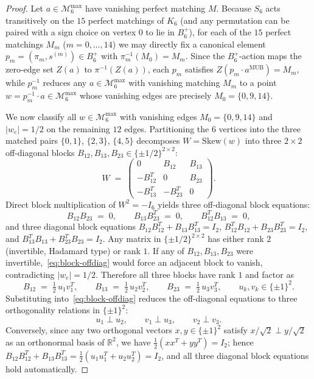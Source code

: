 \documentclass[11pt,a4paper]{article}
\theoremstyle{plain}
\theoremstyle{definition}
\theoremstyle{remark}
\newcommand{\R}{\mathbb{R}}
\newcommand{\Mman}{\mathcal{M}_6}
\newcommand{\Bplus}{B_6^+}
\begin{document}
\begin{proof}
Let $a \in \Mman^{\max}$ have vanishing perfect matching $M$. Because $S_6$ acts transitively on the $15$ perfect matchings of $K_6$ (and any permutation can be paired with a sign choice on vertex $0$ to lie in $\Bplus$), for each of the $15$ perfect matchings $M_m$ ($m = 0,\dots,14$) we may directly fix a canonical element $p_m = (\pi_m, s^{(m)}) \in \Bplus$ with $\pi_m^{-1}(M_0) = M_m$. Since the $\Bplus$-action maps the zero-edge set $Z(a)$ to $\pi^{-1}(Z(a))$, each $p_m$ satisfies $Z(p_m \cdot a^{\mathrm{MUB}}) = M_m$, while $p_m^{-1}$ reduces any $a \in \Mman^{\max}$ with vanishing matching $M_m$ to a point $w = p_m^{-1} \cdot a \in \Mman^{\max}$ whose vanishing edges are precisely $M_0 = \{0, 9, 14\}$.

We now classify all $w \in \Mman^{\max}$ with vanishing edges $M_0 = \{0, 9, 14\}$ and $\lvert w_e\rvert = 1/2$ on the remaining $12$ edges. Partitioning the $6$ vertices into the three matched pairs $\{0,1\}$, $\{2,3\}$, $\{4,5\}$ decomposes $W = \mathrm{Skew}(w)$ into three $2\times 2$ off-diagonal blocks $B_{12}, B_{13}, B_{23} \in \{\pm 1/2\}^{2\times 2}$:
\[
  W \;=\; \begin{pmatrix} 0 & B_{12} & B_{13} \\ -B_{12}^T & 0 & B_{23} \\ -B_{13}^T & -B_{23}^T & 0 \end{pmatrix}.
\]
Direct block multiplication of $W^2 = -I_6$ yields three off-diagonal block equations:
\begin{equation}
  \label{eq:block-offdiag}
  B_{12} B_{23} \;=\; 0, \qquad B_{13} B_{23}^T \;=\; 0, \qquad B_{12}^T B_{13} \;=\; 0,
\end{equation}
and three diagonal block equations $B_{12}B_{12}^T + B_{13}B_{13}^T = I_2$, $B_{12}^T B_{12} + B_{23} B_{23}^T = I_2$, and $B_{13}^T B_{13} + B_{23}^T B_{23} = I_2$. Any matrix in $\{\pm 1/2\}^{2\times 2}$ has either rank $2$ (invertible, Hadamard type) or rank $1$. If any of $B_{12}, B_{13}, B_{23}$ were invertible,~\eqref{eq:block-offdiag} would force an adjacent block to vanish, contradicting $\lvert w_e\rvert = 1/2$. Therefore all three blocks have rank $1$ and factor as
\[
  B_{12} \;=\; \tfrac{1}{2}\,u_1 v_1^T, \qquad
  B_{13} \;=\; \tfrac{1}{2}\,u_2 v_2^T, \qquad
  B_{23} \;=\; \tfrac{1}{2}\,u_3 v_3^T, \qquad u_k, v_k \in \{\pm 1\}^2.
\]
Substituting into~\eqref{eq:block-offdiag} reduces the off-diagonal equations to three orthogonality relations in $\{\pm 1\}^2$:
\[
  u_1 \perp u_2, \qquad v_1 \perp u_3, \qquad v_2 \perp v_3.
\]
Conversely, since any two orthogonal vectors $x, y \in \{\pm 1\}^2$ satisfy $x/\sqrt{2} \perp y/\sqrt{2}$ as an orthonormal basis of $\R^2$, we have $\frac{1}{2}(x x^T + y y^T) = I_2$; hence $B_{12}B_{12}^T + B_{13}B_{13}^T = \frac{1}{2}(u_1 u_1^T + u_2 u_2^T) = I_2$, and all three diagonal block equations hold automatically.


\end{proof}
\end{document}
